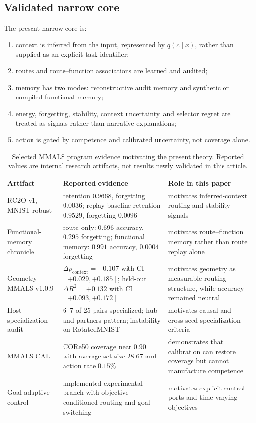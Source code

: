 \documentclass[11pt]{article}
\theoremstyle{definition}\newtheorem{definition}{Definition}\newtheorem{assumption}{Assumption}
\theoremstyle{remark}\newtheorem{remark}{Remark}
\begin{document}
\subsection{Validated narrow core}
The present narrow core is:
\begin{enumerate}[leftmargin=*]
\item context is inferred from the input, represented by $q(c\mid x)$, rather than supplied as an explicit task identifier;
\item routes and route--function associations are learned and audited;
\item memory has two modes: reconstructive audit memory and synthetic or compiled functional memory;
\item energy, forgetting, stability, context uncertainty, and selector regret are treated as signals rather than narrative explanations;
\item action is gated by competence and calibrated uncertainty, not coverage alone.
\end{enumerate}

\begin{table}[ht]
\centering
\caption{Selected MMALS program evidence motivating the present theory. Reported values are internal research artifacts, not results newly validated in this article.}
\small
\begin{tabularx}{\textwidth}{p{}X p{}}
\toprule
Artifact & Reported evidence & Role in this paper\\
\midrule
RC2O v1, MNIST robust & retention $0.9668$, forgetting $0.0036$; replay baseline retention $0.9529$, forgetting $0.0096$ & motivates inferred-context routing and stability signals\\
Functional-memory chronicle & route-only: $0.696$ accuracy, $0.295$ forgetting; functional memory: $0.991$ accuracy, $0.0004$ forgetting & motivates route--function memory rather than route replay alone\\
Geometry-MMALS v1.0.9 & $\Delta\rho_{\mathrm{context}}=+0.107$ with CI $[+0.029,+0.185]$; held-out $\Delta R^2=+0.132$ with CI $[+0.093,+0.172]$ & motivates geometry as measurable routing structure, while accuracy remained neutral\\
Host specialization audit & 6--7 of 25 pairs specialized; hub-and-partners pattern; instability on RotatedMNIST & motivates causal and cross-seed specialization criteria\\
MMALS-CAL & CORe50 coverage near $0.90$ with average set size $28.67$ and action rate $0.15\%$ & demonstrates that calibration can restore coverage but cannot manufacture competence\\
Goal-adaptive control & implemented experimental branch with objective-conditioned routing and goal switching & motivates explicit control ports and time-varying objectives\\
\bottomrule
\end{tabularx}
\end{table}
\end{document}
